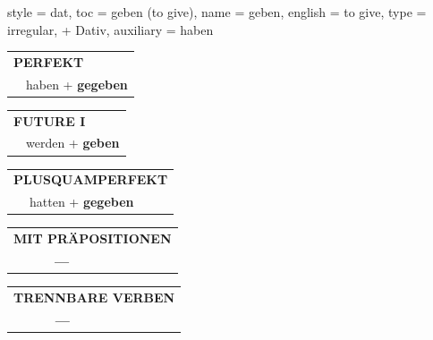 \begin{verbentry}{
  style = {dat},
  toc = {geben (to give)},
  name = {geben},
  english = {to give},
  type = {irregular, + Dativ},
  auxiliary = {haben}
}
 \begin{tabular}{rl}
     \multicolumn{2}{l}{\textbf{PERFEKT}}\\
   & haben + \textbf{gegeben}\\
  \end{tabular}
\hfill
   \begin{tabular}{rl}
   
    \multicolumn{2}{l}{\textbf{FUTURE I} }\\
  &  werden + \textbf{geben}\\
 
  \end{tabular}
\hfill
   \begin{tabular}{rl}
      \multicolumn{2}{l}{\textbf{PLUSQUAMPERFEKT}}\\
  &  hatten + \textbf{gegeben}\\
  \end{tabular}
  
  
\vspace{10pt}

\begin{tabular}{lll}
\multicolumn{3}{l}{\textbf{MIT PRÄPOSITIONEN}}\\
& \textbf{---} & \\
\end{tabular}
\hfill
\begin{tabular}{lll}
\multicolumn{3}{l}{\textbf{TRENNBARE VERBEN}}\\
& \textbf{---} & \\
\end{tabular}
\vspace{-5pt}
\end{verbentry}

